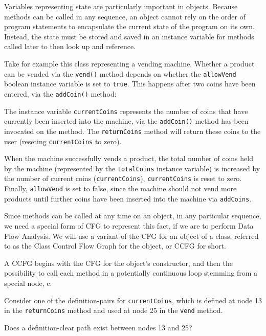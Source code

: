 Variables representing state are particularly important in objects. Because
methods can be called in any sequence, an object cannot rely on the order of
program statements to encapsulate the current state of the program on its own.
Instead, the state must be stored and saved in an instance variable for methods
called later to then look up and reference.


Take for example this class representing a vending machine. Whether a product
can be vended via the {\tt vend()} method depends on whether the {\tt allowVend}
boolean instance variable is set to {\tt true}. This happens after two coins
have been entered, via the {\tt addCoin()} method:


The instance variable {\tt currentCoins} represents the number of coins that
have currently been inserted into the machine, via the {\tt addCoin()} method
has been invocated on the method. The {\tt returnCoins} method will return these
coins to the user (reseting {\tt currentCoins} to zero).

When the machine successfully vends a product, the total number of coins held by
the machine (represented by the {\tt totalCoins} instance variable) is increased
by the number of current coins ({\tt currentCoins}), {\tt currentCoins} is reset
to zero. Finally, {\tt allowVend} is set to false, since the machine should not
vend more products until further coins have been inserted into the machine via
{\tt addCoins}.

Since methods can be called at any time on an object, in any particular
sequence, we need a special form of CFG to represent this fact, if we are to
perform Data Flow Analysis. We will use a variant of the CFG for an object of a
class, referred to as the Class Control Flow Graph for the object, or CCFG for
short. 



A CCFG begins with the CFG for the object's constructor, and then the
possibility to call each method in a potentially continuous loop stemming from a
special node, c.

Consider one of the definition-pairs for {\tt currentCoins}, which is defined at
node 13 in the {\tt returnCoins} method and used at node 25 in the {\tt vend}
method.

Does a definition-clear path exist between nodes 13 and 25?

